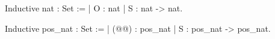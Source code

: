 Inductive nat : Set :=
| O : nat
| S : nat -> nat.

Inductive pos_nat : Set :=
| (@@) : pos_nat
| S : pos_nat -> pos_nat.


